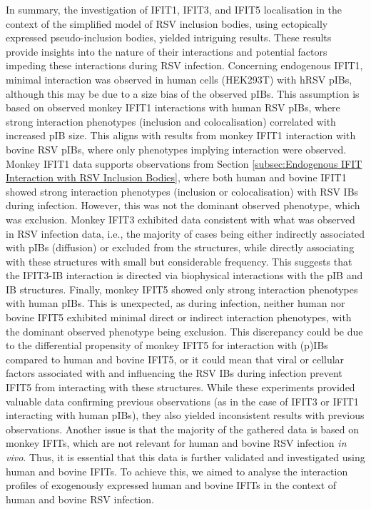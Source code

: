In summary, the investigation of IFIT1, IFIT3, and IFIT5 localisation in the context of the simplified model of RSV inclusion bodies, using ectopically expressed pseudo-inclusion bodies, yielded intriguing results. These results provide insights into the nature of their interactions and potential factors impeding these interactions during RSV infection. Concerning endogenous IFIT1, minimal interaction was observed in human cells (HEK293T) with hRSV pIBs, although this may be due to a size bias of the observed pIBs. This assumption is based on observed monkey IFIT1 interactions with human RSV pIBs, where strong interaction phenotypes (inclusion and colocalisation) correlated with increased pIB size. This aligns with results from monkey IFIT1 interaction with bovine RSV pIBs, where only phenotypes implying interaction were observed. Monkey IFIT1 data supports observations from Section \ref{subsec:Endogenous IFIT Interaction with RSV Inclusion Bodies}, where both human and bovine IFIT1 showed strong interaction phenotypes (inclusion or colocalisation) with RSV IBs during infection. However, this was not the dominant observed phenotype, which was exclusion. Monkey IFIT3 exhibited data consistent with what was observed in RSV infection data, i.e., the majority of cases being either indirectly associated with pIBs (diffusion) or excluded from the structures, while directly associating with these structures with small but considerable frequency. This suggests that the IFIT3-IB interaction is directed via biophysical interactions with the pIB and IB structures. Finally, monkey IFIT5 showed only strong interaction phenotypes with human pIBs. This is unexpected, as during infection, neither human nor bovine IFIT5 exhibited minimal direct or indirect interaction phenotypes, with the dominant observed phenotype being exclusion. This discrepancy could be due to the differential propensity of monkey IFIT5 for interaction with (p)IBs compared to human and bovine IFIT5, or it could mean that viral or cellular factors associated with and influencing the RSV IBs during infection prevent IFIT5 from interacting with these structures. While these experiments provided valuable data confirming previous observations (as in the case of IFIT3 or IFIT1 interacting with human pIBs), they also yielded inconsistent results with previous observations. Another issue is that the majority of the gathered data is based on monkey IFITs, which are not relevant for human and bovine RSV infection \textit{in vivo}. Thus, it is essential that this data is further validated and investigated using human and bovine IFITs. To achieve this, we aimed to analyse the interaction profiles of exogenously expressed human and bovine IFITs in the context of human and bovine RSV infection.

